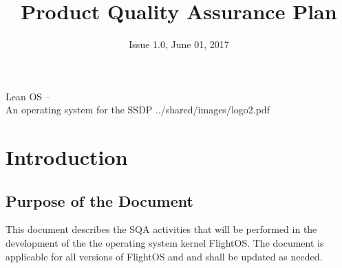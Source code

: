 

\title{Product Quality Assurance Plan}
\def \documentid {FLIGHTOS-UVIE-PAQ-001}
\date{Issue 1.0, June 01, 2017}

\newcommand\affil[1]{\textsuperscript#1}

\def\preparedby {Armin Luntzer\affil{1}}
\def\checkedby {Roland Ottensamer\affil{1}, Christian Reimers\affil{1}}
\def\approvedby {Franz Kerschbaum\affil{1}}

\def\affiliations{
	\affil{1} Department of Astrophysics, University of Vienna
}








 
\usepackage{multicol}
\usepackage{enumitem}
\usepackage{vhistory}

\usepackage{biblatex}








\setmainfont{MyriadPro-SemiCondensed}
\uvietitlepage%
{Lean OS --\\ An operating system for the SSDP}%
{\doctitle}%
{../shared/images/logo2.pdf}
\setmainfont{MyriadPro}

\approvalpage

\tableofcontents
\newpage



\begin{versionhistory}
\end{versionhistory}


\chapter{Introduction}

\section{Purpose of the Document}


This document describes the \gls{SQA} activities that will be
performed in the development of the the operating system kernel FlightOS.
The document is applicable for all versions of FlightOS and and shall be updated
as needed.\\


